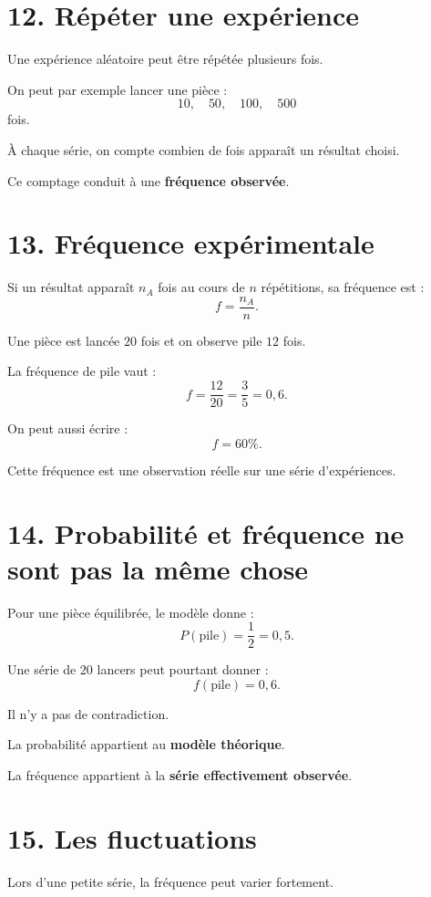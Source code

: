 \section{12. Répéter une expérience}

Une expérience aléatoire peut être répétée plusieurs fois.

On peut par exemple lancer une pièce :
\[
10,\quad50,\quad100,\quad500
\]
fois.

À chaque série, on compte combien de fois apparaît un résultat choisi.

Ce comptage conduit à une \textbf{fréquence observée}.

\section{13. Fréquence expérimentale}

Si un résultat apparaît $n_A$ fois au cours de $n$ répétitions, sa fréquence est :
\[
f=\dfrac{n_A}{n}.
\]

\begin{exemple}
Une pièce est lancée $20$ fois et on observe pile $12$ fois.

La fréquence de pile vaut :
\[
f=\dfrac{12}{20}=\dfrac35=0{,}6.
\]

On peut aussi écrire :
\[
f=60\%.
\]
\end{exemple}

Cette fréquence est une observation réelle sur une série d'expériences.

\section{14. Probabilité et fréquence ne sont pas la même chose}

Pour une pièce équilibrée, le modèle donne :
\[
P(\text{pile})=\dfrac12=0{,}5.
\]

Une série de $20$ lancers peut pourtant donner :
\[
f(\text{pile})=0{,}6.
\]

Il n'y a pas de contradiction.

La probabilité appartient au \textbf{modèle théorique}.

La fréquence appartient à la \textbf{série effectivement observée}.

\section{15. Les fluctuations}

Lors d'une petite série, la fréquence peut varier fortement.


